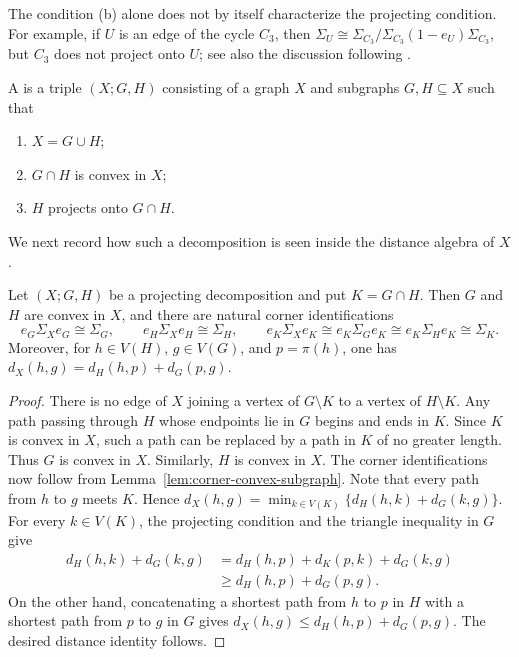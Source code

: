 \documentclass[a4paper,leqno]{amsart}
\begin{document}
\begin{rmk}\label{rmk:quotient-not-projecting}
The condition (b) alone does not by itself characterize the projecting condition.  For example, if $U$ is an edge of the cycle $C_3$, then $\Sigma_U\cong\Sigma_{C_3}/\Sigma_{C_3}(1-e_U)\Sigma_{C_3}$, but
$C_3$ does not project onto $U$; see also the discussion following 
\cite[Definition~6.2]{HW17}.
\end{rmk}

\begin{dfn}\label{def:projecting-decomposition}
A  is a triple $(X;G,H)$ consisting
of a graph $X$ and subgraphs $G,H\subseteq X$ such that
\begin{enumerate}
    \item $X=G\cup H$;
    \item $G\cap H$ is convex in $X$;
    \item $H$ projects onto $G\cap H$.
\end{enumerate}
\end{dfn}

We next record how such a decomposition is seen inside the distance
algebra of $X$.

\begin{prop}\label{prop:projecting-decomposition-algebra}
Let $(X;G,H)$ be a projecting decomposition and put $K=G\cap H$.
Then $G$ and $H$ are convex in $X$, and there are natural corner
identifications
\[
e_G\Sigma_Xe_G\cong\Sigma_G,
\qquad
e_H\Sigma_Xe_H\cong\Sigma_H,
\qquad
e_K\Sigma_Xe_K
\cong
e_K\Sigma_Ge_K
\cong
e_K\Sigma_He_K
\cong
\Sigma_K.
\]
Moreover, for $h\in V(H)$, $g\in V(G)$, and $p=\pi(h)$, one has
$d_X(h,g)=d_H(h,p)+d_G(p,g).$
\end{prop}

\begin{proof}
There is no edge of $X$ joining a vertex of $G\setminus K$ to a
vertex of $H\setminus K$. Any path passing through $H$ whose
endpoints lie in $G$ begins and ends in $K$. Since $K$ is
convex in $X$, such a path can be replaced by a path in $K$ of
no greater length. Thus $G$ is convex in $X$. Similarly, $H$ is convex in $X$. The corner identifications now follow from
Lemma~\ref{lem:corner-convex-subgraph}. Note that every path from $h$ to $g$ meets $K$. Hence
$d_X(h,g)= \min_{k\in V(K)}
\bigl\{d_H(h,k)+d_G(k,g)\bigr\}$.
For every $k\in V(K)$, the projecting condition and the triangle
inequality in $G$ give
\[
\begin{aligned}
d_H(h,k)+d_G(k,g)
&=
d_H(h,p)+d_K(p,k)+d_G(k,g)\\
&\geq
d_H(h,p)+d_G(p,g).
\end{aligned}
\]
On the other hand, concatenating a shortest path from $h$ to $p$ in
$H$ with a shortest path from $p$ to $g$ in $G$ gives
$d_X(h,g)\leq d_H(h,p)+d_G(p,g)$. The desired distance identity follows.
\end{proof}
\end{document}
